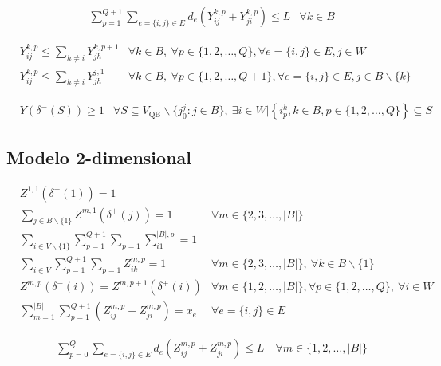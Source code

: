\documentclass[10pt, a4paper]{article}
\theoremstyle{definition}
\begin{document}
\begin{align}
	& \sum_{p=1}^{Q+1} \sum_{e=\{i, j\} \in E} d_{e}\left(Y_{i j}^{k, p}+Y_{j i}^{k, p}\right) \leq L & \forall k \in B \label{eq:26}
\end{align}

\begin{align}
	& Y_{i j}^{k, p} \leq \sum_{h \neq i} Y_{j h}^{k, p+1} & \forall k \in B,\ \forall p \in\{1,2, \ldots, Q\}, \forall e=\{i, j\} \in E, j \in W \label{eq:27} \\
	& Y_{i j}^{k, p} \leq \sum_{h \neq i} Y_{j h}^{j, 1} & \forall k \in B,\ \forall p \in\{1,2, \ldots, Q+1\}, \forall e=\{i, j\} \in E, j \in B \backslash\{k\} \label{eq:28}
\end{align}

\begin{align}
	& Y\left(\delta^{-}(S)\right) \geq 1 & \forall S \subseteq V_{\mathrm{QB}} \backslash\{j_{0}^{j} : j \in B\},\ \exists i \in W |\left\{i_{p}^{k}, k \in B, p \in\{1,2, \ldots, Q\}\right\} \subseteq S \label{eq:29}
\end{align}

\subsection{Modelo 2-dimensional}

\begin{align}
	& Z^{1,1}\left(\delta^{+}(1)\right)=1 \label{eq:30} \\
	& \sum_{j \in B \backslash\{1\}} Z^{m, 1}\left(\delta^{+}(j)\right)=1 & \forall m \in\{2,3, \ldots,|B|\} \label{eq:31} \\
	& \sum_{i \in V \backslash\{1\}} \sum_{p=1}^{Q+1} \sum_{p=1} \sum_{i 1}^{|B|, p}=1 \label{eq:32} \\
	& \sum_{i \in V} \sum_{p=1}^{Q+1} \sum_{p=1} Z_{i k}^{m, p}=1 & \forall m \in\{2,3, \ldots,|B|\},\ \forall k \in B \backslash\{1\} \label{eq:33} \\
	& Z^{m, p}\left(\delta^{-}(i)\right)=Z^{m, p+1}\left(\delta^{+}(i)\right) & \forall m \in\{1,2, \ldots,|B|\}, \forall p \in\{1,2, \ldots, Q\},\ \forall i \in W \label{eq:34} \\
	& \sum_{m=1}^{|B|} \sum_{p=1}^{Q+1}\left(Z_{i j}^{m, p}+Z_{j i}^{m, p}\right)=x_{e} & \forall e=\{i, j\} \in E \label{eq:35}
\end{align}

\begin{align}
	& \sum_{p=0}^{Q} \sum_{e=\{i, j\} \in E} d_{e}\left(Z_{i j}^{m, p}+Z_{j i}^{m, p}\right) \leq L \quad \forall m \in\{1,2, \ldots,|B|\} \label{eq:36}
\end{align}
\end{document}
